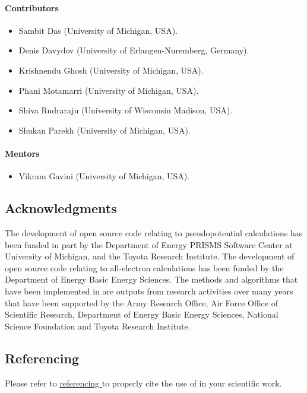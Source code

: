 \paragraph{Contributors}
\begin{itemize}
	\item Sambit Das (University of Michigan, USA).
	\item Denis Davydov (University of Erlangen-Nuremberg, Germany).
	\item Krishnendu Ghosh (University of Michigan, USA).
	\item Phani Motamarri (University of Michigan, USA).
	\item Shiva Rudraraju (University of Wisconsin Madison, USA).
	\item Shukan Parekh (University of Michigan, USA). 	
\end{itemize}

\paragraph{Mentors}
\begin{itemize}
	\item Vikram Gavini (University of Michigan, USA).
\end{itemize}

\subsection{Acknowledgments}
The development of \dftfe{} open source code relating to pseudopotential calculations has been funded in part by the Department 
of Energy PRISMS Software Center at University of Michigan, and the Toyota Research Institute. The development of \dftfe{} open 
source code relating to all-electron calculations has been funded by the Department of Energy Basic Energy Sciences. The methods 
and algorithms that have been implemented in \dftfe{} are outputs from research activities over many years that have been 
supported by the Army Research Office, Air Force Office of Scientific Research, Department of Energy Basic Energy Sciences, 
National Science Foundation and Toyota Research Institute. 

\subsection{Referencing \dftfe{}}
Please refer to \href{https://sites.google.com/umich.edu/dftfe/referencing}{referencing  \dftfe{}} to properly cite the use of 
\dftfe{} in your scientific work. 
